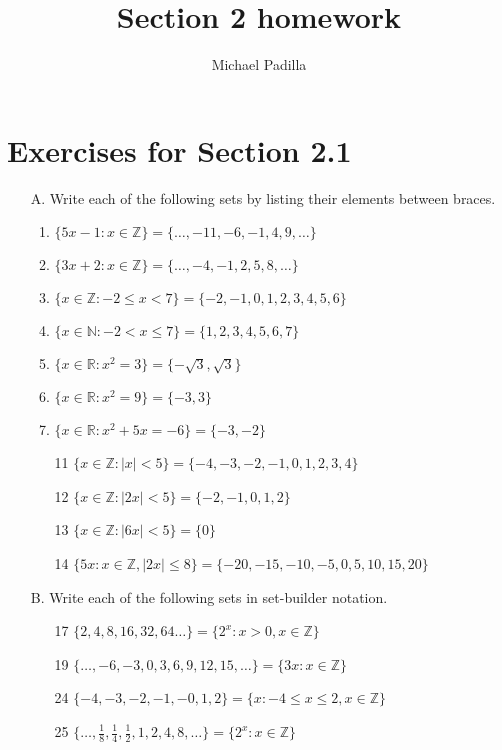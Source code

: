 \documentclass[12pt]{article}
\title{Section 2 homework}
\author{Michael Padilla}
\begin{document}
\maketitle

\section*{Exercises for Section 2.1}
\begin{itemize}
    \item[A.] Write each of the following sets by listing their elements between braces.
	\begin{enumerate}
	    \item $\{5x - 1 : x \in \mathbb{Z}\} = \{\ldots, -11, -6, -1, 4, 9, \ldots\}$
	    \item $\{3x + 2 : x \in \mathbb{Z}\} = \{\ldots, -4, -1, 2, 5, 8, \ldots\}$
	    \item $\{x \in \mathbb{Z} : -2 \le x < 7\} = \{-2, -1, 0, 1, 2, 3, 4, 5, 6\}$
	    \item $\{x \in \mathbb{N} : -2 < x \le 7\} = \{1, 2, 3, 4, 5, 6, 7 \}$
	    \item $\{x \in \mathbb{R} : x^2 = 3\} = \{-\sqrt{3}, \sqrt{3}  \}$
	    \item $\{x \in \mathbb{R} : x^2 = 9\} = \{-3, 3  \}$
	    \item $\{x \in \mathbb{R} : x^2 + 5x = -6\} = \{-3, -2  \}$
	    \item[11] $\{x \in \mathbb{Z} : |x| < 5 \} = \{-4, -3, -2, -1, 0, 1, 2, 3, 4  \}$
	    \item[12] $\{x \in \mathbb{Z} : |2x| < 5 \} = \{-2, -1, 0, 1, 2 \}$
	    \item[13] $\{x \in \mathbb{Z} : |6x| < 5 \} = \{0\}$
	    \item[14] $\{5x : x \in \mathbb{Z}, |2x| \le 8 \} = \{-20, -15, -10, -5, 0, 5, 10, 15, 20 \}$
	\end{enumerate}
    \item[B.] Write each of the following sets in set-builder notation.
	\begin{enumerate}
	    \item[17] $\{2,4,8,16,32,64\ldots\} = \{2^x: x > 0, x \in \mathbb{Z}\}$
	    \item[19] $\{\ldots, -6, -3, 0, 3, 6, 9, 12, 15, \ldots \} = \{3x: x \in \mathbb{Z}\}$
	    \item[24] $\{-4,-3,-2,-1,-0,1,2\} = \{x: -4 \le x \le 2, x \in \mathbb{Z}\}$
	    \item[25] $\{\ldots, \frac{1}{8} ,\frac{1}{4} ,\frac{1}{2},1,2,4,8, \ldots\} = \{2^x:x \in \mathbb{Z}\}$

\end{enumerate}
\end{itemize}
\end{document}
